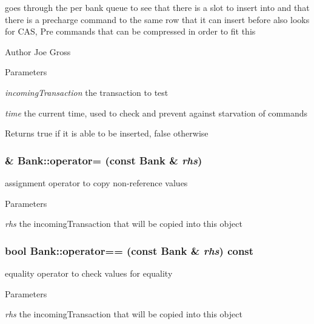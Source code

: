 goes through the per bank queue to see that there is a slot to insert into and that there is a precharge command to the same row that it can insert before also looks for CAS, Pre commands that can be compressed in order to fit this \begin{DoxyAuthor}{Author}
Joe Gross 
\end{DoxyAuthor}

\begin{DoxyParams}{Parameters}
\item[{\em incomingTransaction}]the transaction to test \item[{\em time}]the current time, used to check and prevent against starvation of commands \end{DoxyParams}
\begin{DoxyReturn}{Returns}
true if it is able to be inserted, false otherwise 
\end{DoxyReturn}
\subsubsection[{operator=}]{ \& Bank::operator= (const {\bf Bank} \& {\em rhs})}\label{class_d_r_a_msim_i_i_1_1_bank_aa920eb2489a9724e3d2093aa7765c330}


assignment operator to copy non-\/reference values 


\begin{DoxyParams}{Parameters}
\item[{\em rhs}]the incomingTransaction that will be copied into this object \end{DoxyParams}
\subsubsection[{operator==}]{\setlength{\rightskip}{0pt plus 5cm}bool Bank::operator== (const {\bf Bank} \& {\em rhs}) const}\label{class_d_r_a_msim_i_i_1_1_bank_ad8aad44df9b266d6a91daa622c5d61f1}


equality operator to check values for equality 


\begin{DoxyParams}{Parameters}
\item[{\em rhs}]the incomingTransaction that will be copied into this object \end{DoxyParams}
